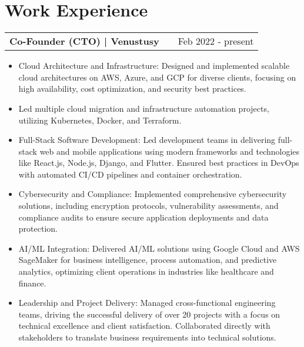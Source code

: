 \documentclass[a4paper,11pt]{article}
\makeatletter
\newenvironment{joblong}[2]
    {
    \begin{tabularx}{\linewidth}{@{}l X r@{}}
    \textbf{#1} & \hfill &  #2 \\[3.75pt]
    \end{tabularx}
    \begin{minipage}[t]{\linewidth}
    \begin{itemize}[nosep,after=\strut, leftmargin=1em, itemsep=3pt,label=--]
    }
    {
    \end{itemize}
    \end{minipage}    
    }
\makeatother
\begin{document}
\section{Work Experience}

\begin{joblong}{Co-Founder (CTO) | Venustusy}{Feb 2022 - present}
\item Cloud Architecture and Infrastructure: Designed and implemented scalable cloud architectures on AWS, Azure, and GCP for diverse clients, focusing on high availability, cost optimization, and security best practices. 
\item Led multiple cloud migration and infrastructure automation projects, utilizing Kubernetes, Docker, and Terraform.
\item Full-Stack Software Development: Led development teams in delivering full-stack web and mobile applications using modern frameworks and technologies like React.js, Node.js, Django, and Flutter. Ensured best practices in DevOps with automated CI/CD pipelines and container orchestration.
\item Cybersecurity and Compliance: Implemented comprehensive cybersecurity solutions, including encryption protocols, vulnerability assessments, and compliance audits to ensure secure application deployments and data protection.
\item AI/ML Integration: Delivered AI/ML solutions using Google Cloud and AWS SageMaker for business intelligence, process automation, and predictive analytics, optimizing client operations in industries like healthcare and finance.
\item Leadership and Project Delivery: Managed cross-functional engineering teams, driving the successful delivery of over 20 projects with a focus on technical excellence and client satisfaction. Collaborated directly with stakeholders to translate business requirements into technical solutions.
\end{joblong}
\end{document}
